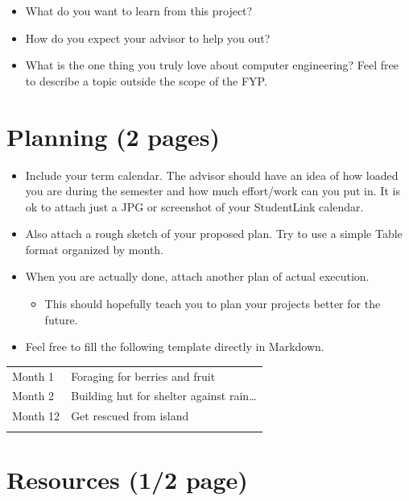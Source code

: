 \begin{itemize}
\itemsep1pt\parskip0pt
\item
  What do you want to learn from this project?
\item
  How do you expect your advisor to help you out?
\item
  What is the one thing you truly love about computer
  engineering? Feel free to describe a topic outside the
  scope of the FYP.
\end{itemize}

\section{Planning (2 pages)}

\begin{itemize}
\itemsep1pt\parskip0pt
\item
  Include your term calendar. The advisor should have an
  idea of how loaded you are during the semester and how
  much effort/work can you put in. It is ok to attach just a
  JPG or screenshot of your StudentLink calendar.
\item
  Also attach a rough sketch of your proposed plan. Try to
  use a simple Table format organized by month.
\item
  When you are actually done, attach another plan of actual
  execution.

  \begin{itemize}
  \itemsep1pt\parskip0pt
  \item
    This should hopefully teach you to plan your projects
    better for the future.
  \end{itemize}
\item
  Feel free to fill the following template directly in
  Markdown.
\end{itemize}

\begin{longtable}[c]{@{}ll@{}}
\hline\noalign{\medskip}
Month 1 & Foraging for berries and fruit
\\\noalign{\medskip}
Month 2 & Building hut for shelter against rain\ldots{}
\\\noalign{\medskip}
Month 12 & Get rescued from island
\\\noalign{\medskip}
\hline
\end{longtable}

\section{Resources (1/2 page)}

